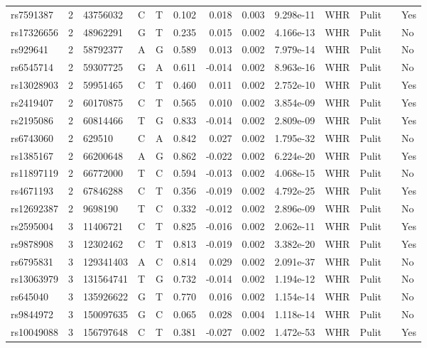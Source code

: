 \documentclass[11pt,twoside]{bristolthesis}
\begin{document}
\begin{longtable}[t]{lrlllrrrlllll}
\addlinespace
rs7591387 & 2 & 43756032 & C & T & 0.102 & 0.018 & 0.003 & 9.298e-11 & WHR & Pulit &  & Yes\\
rs17326656 & 2 & 48962291 & G & T & 0.235 & 0.015 & 0.002 & 4.166e-13 & WHR & Pulit &  & No\\
rs929641 & 2 & 58792377 & A & G & 0.589 & 0.013 & 0.002 & 7.979e-14 & WHR & Pulit &  & No\\
rs6545714 & 2 & 59307725 & G & A & 0.611 & -0.014 & 0.002 & 8.963e-16 & WHR & Pulit &  & No\\
rs13028903 & 2 & 59951465 & C & T & 0.460 & 0.011 & 0.002 & 2.752e-10 & WHR & Pulit &  & Yes\\
\addlinespace
rs2419407 & 2 & 60170875 & C & T & 0.565 & 0.010 & 0.002 & 3.854e-09 & WHR & Pulit &  & Yes\\
rs2195086 & 2 & 60814466 & T & G & 0.833 & -0.014 & 0.002 & 2.809e-09 & WHR & Pulit &  & Yes\\
rs6743060 & 2 & 629510 & C & A & 0.842 & 0.027 & 0.002 & 1.795e-32 & WHR & Pulit &  & No\\
rs1385167 & 2 & 66200648 & A & G & 0.862 & -0.022 & 0.002 & 6.224e-20 & WHR & Pulit &  & Yes\\
rs11897119 & 2 & 66772000 & T & C & 0.594 & -0.013 & 0.002 & 4.068e-15 & WHR & Pulit &  & No\\
\addlinespace
rs4671193 & 2 & 67846288 & C & T & 0.356 & -0.019 & 0.002 & 4.792e-25 & WHR & Pulit &  & Yes\\
rs12692387 & 2 & 9698190 & T & C & 0.332 & -0.012 & 0.002 & 2.896e-09 & WHR & Pulit &  & No\\
rs2595004 & 3 & 11406721 & C & T & 0.825 & -0.016 & 0.002 & 2.062e-11 & WHR & Pulit &  & Yes\\
rs9878908 & 3 & 12302462 & C & T & 0.813 & -0.019 & 0.002 & 3.382e-20 & WHR & Pulit &  & Yes\\
rs6795831 & 3 & 129341403 & A & C & 0.814 & 0.029 & 0.002 & 2.091e-37 & WHR & Pulit &  & No\\
\addlinespace
rs13063979 & 3 & 131564741 & T & G & 0.732 & -0.014 & 0.002 & 1.194e-12 & WHR & Pulit &  & No\\
rs645040 & 3 & 135926622 & G & T & 0.770 & 0.016 & 0.002 & 1.154e-14 & WHR & Pulit &  & No\\
rs9844972 & 3 & 150097635 & G & C & 0.065 & 0.028 & 0.004 & 1.118e-14 & WHR & Pulit &  & No\\
rs10049088 & 3 & 156797648 & C & T & 0.381 & -0.027 & 0.002 & 1.472e-53 & WHR & Pulit &  & Yes\\

\end{longtable}
\end{document}
